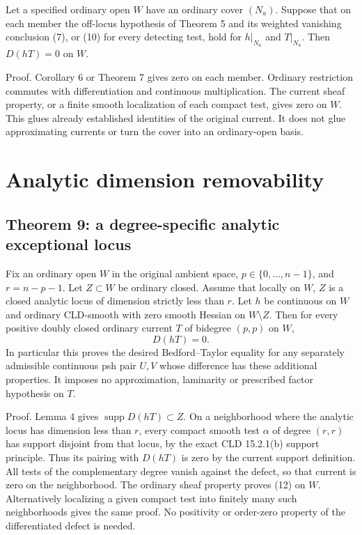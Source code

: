 \documentclass[11pt]{article}
\begin{document}
Let a specified ordinary open \(W\) have an ordinary cover \((N_a)\). Suppose that on each member the off-locus hypothesis of Theorem 5 and its weighted vanishing conclusion (7), or (10) for every detecting test, hold for \(h|_{N_a}\) and \(T|_{N_a}\). Then \(D(hT)=0\) on \(W\).

Proof. Corollary 6 or Theorem 7 gives zero on each member. Ordinary restriction commutes with differentiation and continuous multiplication. The current sheaf property, or a finite smooth localization of each compact test, gives zero on \(W\). This glues already established identities of the original current. It does not glue approximating currents or turn the cover into an ordinary-open basis.


\section{Analytic dimension removability}

\subsection{Theorem 9: a degree-specific analytic exceptional locus}

Fix an ordinary open \(W\) in the original ambient space, \(p\in\{0,\ldots,n-1\}\), and \(r=n-p-1\). Let \(Z\subset W\) be ordinary closed. Assume that locally on \(W\), \(Z\) is a closed analytic locus of dimension strictly less than \(r\). Let \(h\) be continuous on \(W\) and ordinary CLD-smooth with zero smooth Hessian on \(W\setminus Z\). Then for every positive doubly closed ordinary current \(T\) of bidegree \((p,p)\) on \(W\),
\[
 D(hT)=0.\tag{12}
\]
In particular this proves the desired Bedford--Taylor equality for any separately admissible continuous psh pair \(U,V\) whose difference has these additional properties. It imposes no approximation, laminarity or prescribed factor hypothesis on \(T\).

Proof. Lemma 4 gives \(\operatorname{supp}D(hT)\subset Z\). On a neighborhood where the analytic locus has dimension less than \(r\), every compact smooth test \(\alpha\) of degree \((r,r)\) has support disjoint from that locus, by the exact CLD 15.2.1(b) support principle. Thus its pairing with \(D(hT)\) is zero by the current support definition. All tests of the complementary degree vanish against the defect, so that current is zero on the neighborhood. The ordinary sheaf property proves (12) on \(W\). Alternatively localizing a given compact test into finitely many such neighborhoods gives the same proof. No positivity or order-zero property of the differentiated defect is needed.
\end{document}
